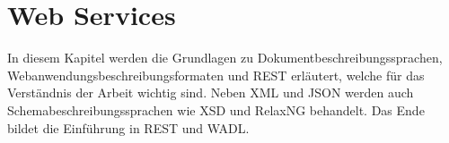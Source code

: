 \chapter{Web Services}
\label{sec:web_services}


In diesem Kapitel werden die Grundlagen zu Dokumentbeschreibungssprachen, Webanwendungsbeschreibungsformaten und \gls{REST} erläutert, welche für das Verständnis der Arbeit wichtig sind. 
Neben \gls{XML} und  \gls{JSON} werden auch Schemabeschreibungssprachen wie \gls{XSD} und \gls{RelaxNG} behandelt.
Das Ende bildet die Einführung in \gls{REST} und \gls{WADL}.







